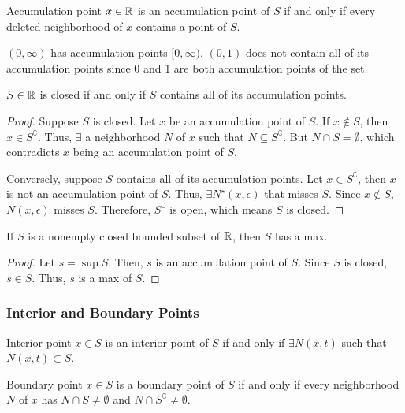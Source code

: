 \begin{definition}{Accumulation point}{}
    $x \in \mathbb{R}$ is an accumulation point of $S$ if and only if every deleted neighborhood of $x$ contains a point of $S$.
\end{definition}
\begin{note}
    $(0, \infty)$ has accumulation points $[0, \infty)$. $(0, 1)$ does not contain all of its accumulation points since 0 and 1 are both accumulation points of the set.
\end{note}

\begin{theorem}{}{}
    $S \in \mathbb{R}$ is closed if and only if $S$ contains all of its accumulation points.
\end{theorem}
\begin{proof}
    Suppose $S$ is closed. Let $x$ be an accumulation point of $S$. If $x \not\in S$, then $x \in S^\complement$. Thus, $\exists$ a neighborhood $N$ of $x$ such that $N \subseteq S^\complement$. But $N \cap S = \emptyset$, which contradicts $x$ being an accumulation point of $S$.

    Conversely, suppose $S$ contains all of its accumulation points. Let $x \in S^\complement$, then $x$ is not an accumulation point of $S$. Thus, $\exists N^\star(x, \epsilon)$ that misses $S$. Since $x \not\in S$, $N(x, \epsilon)$ misses $S$. Therefore, $S^\complement$ is open, which means $S$ is closed.
\end{proof}

\begin{theorem}{}{}
    If $S$ is a nonempty closed bounded subset of $\mathbb{R}$, then $S$ has a max.
\end{theorem}
\begin{proof}
    Let $s = \sup S$. Then, $s$ is an accumulation point of $S$. Since $S$ is closed, $s \in S$. Thus, $s$ is a max of $S$.
\end{proof}

\subsubsection{Interior and Boundary Points}
\begin{definition}{Interior point}{}
    $x \in S$ is an interior point of $S$ if and only if $\exists N(x, t)$ such that $N(x, t) \subset S$.
\end{definition}

\begin{definition}{Boundary point}{}
    $x \in S$ is a boundary point of $S$ if and only if every neighborhood $N$ of $x$ has $N \cap S \neq \emptyset$ and $N \cap S^\complement \neq \emptyset$.
\end{definition}


